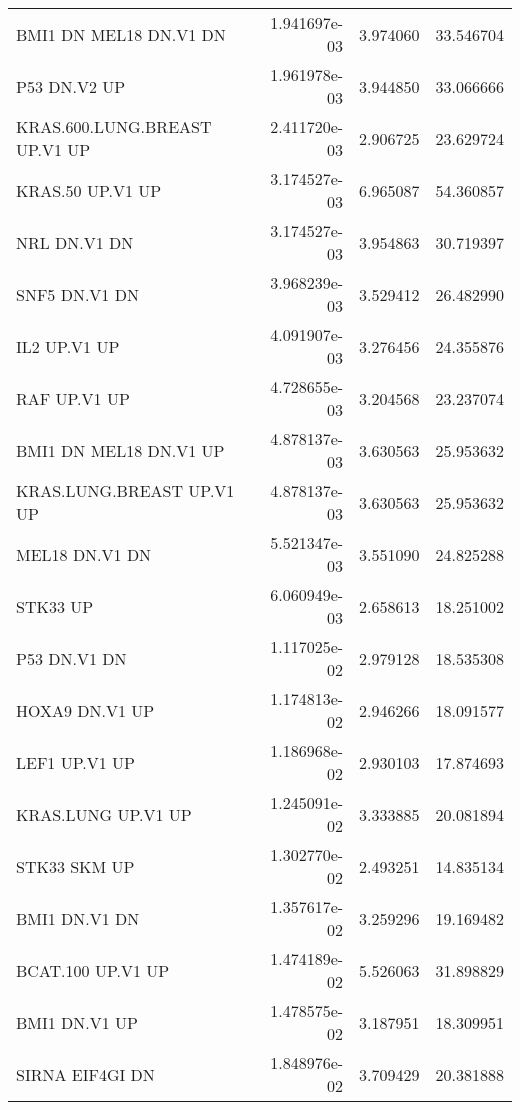\begin{tabular}{lrrr}
            BMI1 DN MEL18 DN.V1 DN &      1.941697e-03 &  3.974060 &       33.546704 \\
                      P53 DN.V2 UP &      1.961978e-03 &  3.944850 &       33.066666 \\
     KRAS.600.LUNG.BREAST UP.V1 UP &      2.411720e-03 &  2.906725 &       23.629724 \\
                  KRAS.50 UP.V1 UP &      3.174527e-03 &  6.965087 &       54.360857 \\
                      NRL DN.V1 DN &      3.174527e-03 &  3.954863 &       30.719397 \\
                     SNF5 DN.V1 DN &      3.968239e-03 &  3.529412 &       26.482990 \\
                      IL2 UP.V1 UP &      4.091907e-03 &  3.276456 &       24.355876 \\
                      RAF UP.V1 UP &      4.728655e-03 &  3.204568 &       23.237074 \\
            BMI1 DN MEL18 DN.V1 UP &      4.878137e-03 &  3.630563 &       25.953632 \\
         KRAS.LUNG.BREAST UP.V1 UP &      4.878137e-03 &  3.630563 &       25.953632 \\
                    MEL18 DN.V1 DN &      5.521347e-03 &  3.551090 &       24.825288 \\
                          STK33 UP &      6.060949e-03 &  2.658613 &       18.251002 \\
                      P53 DN.V1 DN &      1.117025e-02 &  2.979128 &       18.535308 \\
                    HOXA9 DN.V1 UP &      1.174813e-02 &  2.946266 &       18.091577 \\
                     LEF1 UP.V1 UP &      1.186968e-02 &  2.930103 &       17.874693 \\
                KRAS.LUNG UP.V1 UP &      1.245091e-02 &  3.333885 &       20.081894 \\
                      STK33 SKM UP &      1.302770e-02 &  2.493251 &       14.835134 \\
                     BMI1 DN.V1 DN &      1.357617e-02 &  3.259296 &       19.169482 \\
                 BCAT.100 UP.V1 UP &      1.474189e-02 &  5.526063 &       31.898829 \\
                     BMI1 DN.V1 UP &      1.478575e-02 &  3.187951 &       18.309951 \\
                   SIRNA EIF4GI DN &      1.848976e-02 &  3.709429 &       20.381888 \\

\end{tabular}
